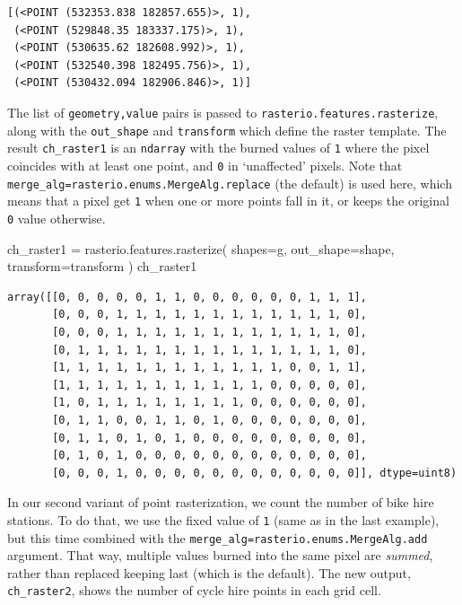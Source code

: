 \documentclass[
  letterpaper,
]{krantz}
\newenvironment{Shaded}{\begin{snugshade}}{\end{snugshade}}
\newcommand{\NormalTok}[1]{\textcolor[rgb]{0.00,0.23,0.31}{#1}}
\newcommand{\OperatorTok}[1]{\textcolor[rgb]{0.37,0.37,0.37}{#1}}
\begin{document}
\begin{verbatim}
[(<POINT (532353.838 182857.655)>, 1),
 (<POINT (529848.35 183337.175)>, 1),
 (<POINT (530635.62 182608.992)>, 1),
 (<POINT (532540.398 182495.756)>, 1),
 (<POINT (530432.094 182906.846)>, 1)]
\end{verbatim}

The list of \texttt{geometry,value} pairs is passed to
\texttt{rasterio.features.rasterize}, along with the \texttt{out\_shape}
and \texttt{transform} which define the raster template. The result
\texttt{ch\_raster1} is an \texttt{ndarray} with the burned values of
\texttt{1} where the pixel coincides with at least one point, and
\texttt{0} in `unaffected' pixels. Note that
\texttt{merge\_alg=rasterio.enums.MergeAlg.replace} (the default) is
used here, which means that a pixel get \texttt{1} when one or more
points fall in it, or keeps the original \texttt{0} value otherwise.

\begin{Shaded}
\begin{Highlighting}[]
\NormalTok{ch\_raster1 }\OperatorTok{=}\NormalTok{ rasterio.features.rasterize(}
\NormalTok{    shapes}\OperatorTok{=}\NormalTok{g,}
\NormalTok{    out\_shape}\OperatorTok{=}\NormalTok{shape, }
\NormalTok{    transform}\OperatorTok{=}\NormalTok{transform}
\NormalTok{)}
\NormalTok{ch\_raster1}
\end{Highlighting}
\end{Shaded}

\begin{verbatim}
array([[0, 0, 0, 0, 0, 1, 1, 0, 0, 0, 0, 0, 0, 1, 1, 1],
       [0, 0, 0, 1, 1, 1, 1, 1, 1, 1, 1, 1, 1, 1, 1, 0],
       [0, 0, 0, 1, 1, 1, 1, 1, 1, 1, 1, 1, 1, 1, 1, 0],
       [0, 1, 1, 1, 1, 1, 1, 1, 1, 1, 1, 1, 1, 1, 1, 0],
       [1, 1, 1, 1, 1, 1, 1, 1, 1, 1, 1, 1, 0, 0, 1, 1],
       [1, 1, 1, 1, 1, 1, 1, 1, 1, 1, 1, 0, 0, 0, 0, 0],
       [1, 0, 1, 1, 1, 1, 1, 1, 1, 1, 0, 0, 0, 0, 0, 0],
       [0, 1, 1, 0, 0, 1, 1, 0, 1, 0, 0, 0, 0, 0, 0, 0],
       [0, 1, 1, 0, 1, 0, 1, 0, 0, 0, 0, 0, 0, 0, 0, 0],
       [0, 1, 0, 1, 0, 0, 0, 0, 0, 0, 0, 0, 0, 0, 0, 0],
       [0, 0, 0, 1, 0, 0, 0, 0, 0, 0, 0, 0, 0, 0, 0, 0]], dtype=uint8)
\end{verbatim}

In our second variant of point rasterization, we count the number of
bike hire stations. To do that, we use the fixed value of \texttt{1}
(same as in the last example), but this time combined with the
\texttt{merge\_alg=rasterio.enums.MergeAlg.add} argument. That way,
multiple values burned into the same pixel are \emph{summed}, rather
than replaced keeping last (which is the default). The new output,
\texttt{ch\_raster2}, shows the number of cycle hire points in each grid
cell.
\end{document}
